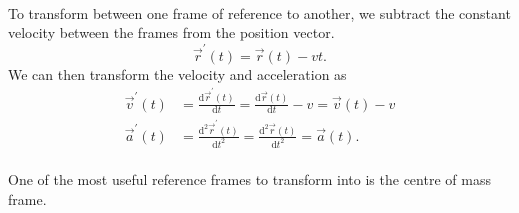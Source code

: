 \documentclass[../classical_mechanics.tex]{subfiles}
\begin{document}
        \paragraph{}
        To transform between one frame of reference to another, we subtract the constant velocity between the frames from the position vector.
        \begin{equation}
            \vec{r}^\prime(t) = \vec{r}(t) - vt.
        \end{equation}
        We can then transform the velocity and acceleration as
        \begin{align}
            \vec{v}^\prime(t)&=\frac{\mathrm{d}\vec{r}^\prime(t)}{\mathrm{d}t}=\frac{\mathrm{d}\vec{r}(t)}{\mathrm{d}t}-v=\vec{v}(t)-v\\
            \vec{a}^\prime(t)&=\frac{\mathrm{d}^2\vec{r}^\prime(t)}{\mathrm{d}t^2}=\frac{\mathrm{d}^2\vec{r}(t)}{\mathrm{d}t^2}=\vec{a}(t).
        \end{align}

        \paragraph{}
        One of the most useful reference frames to transform into is the centre of mass frame.
\end{document}
